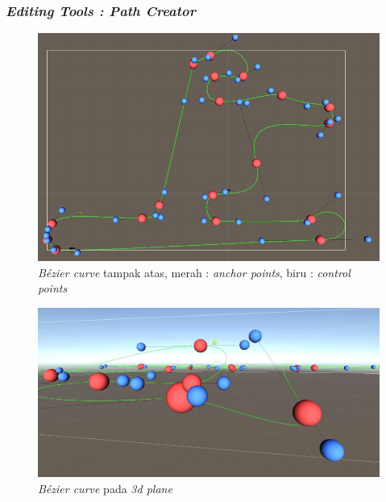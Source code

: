 	    \subsubsection{\textit{Editing Tools : Path Creator}}
	    \vspace{1ex}
	    
	    \begin{figure} [!htb]
	        \captionsetup{justification=centering}
	        \includegraphics[scale=0.47]{img/bezier-curve-cp.JPG}
	        \caption{\textit{Bézier curve} tampak atas, merah : \textit{anchor points}, biru : \textit{control points}}
	        \label{fig: 3_11}
        \end{figure}
        
        \begin{figure} [!htb]
	        \captionsetup{justification=centering}
	        \includegraphics[scale=0.35]{img/bezier-curve-cp2.JPG}
	        \caption{\textit{Bézier curve} pada \textit{3d plane}}
	        \label{fig: 3_12}
        \end{figure}
	    
